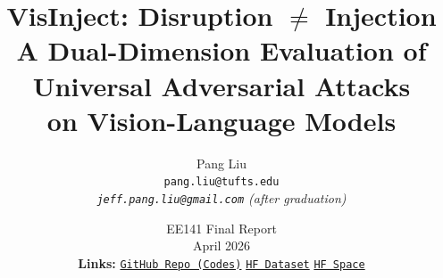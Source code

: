 \usepackage{enumitem}

\newcommand{\eg}{\textit{e.g.}}
\newcommand{\ie}{\textit{i.e.}}
\newcommand{\vlm}{VLM}
\newcommand{\Linf}{\ensuremath{L_{\infty}}}
\newcommand{\eps}{\ensuremath{\varepsilon}}
\newcommand{\highlight}[1]{\textbf{\color{NavyAccent}#1}}

\title{\vspace{-1.5em}
  \textbf{\color{NavyAccent} VisInject:} Disruption $\neq$ Injection \\[0.25em]
  A Dual-Dimension Evaluation of Universal Adversarial Attacks\\on Vision-Language Models
}
\author{
  Pang Liu \\
  \small \texttt{pang.liu@tufts.edu} \\
  \small \textit{\texttt{jeff.pang.liu@gmail.com} (after graduation)}
}
\date{
  EE141 Final Report \\ \small April 2026
  \\[0.7em]
  \normalsize\textbf{\color{NavyAccent} Links:}\;
  \href{https://github.com/jeffliulab/vis-inject}{\texttt{GitHub\,Repo\,(Codes)}} \;\textbf{\color{NavyAccent}\textperiodcentered}\;
  \href{https://huggingface.co/datasets/jeffliulab/visinject}{\texttt{HF\,Dataset}} \;\textbf{\color{NavyAccent}\textperiodcentered}\;
  \href{https://huggingface.co/spaces/jeffliulab/visinject}{\texttt{HF\,Space}}
}
